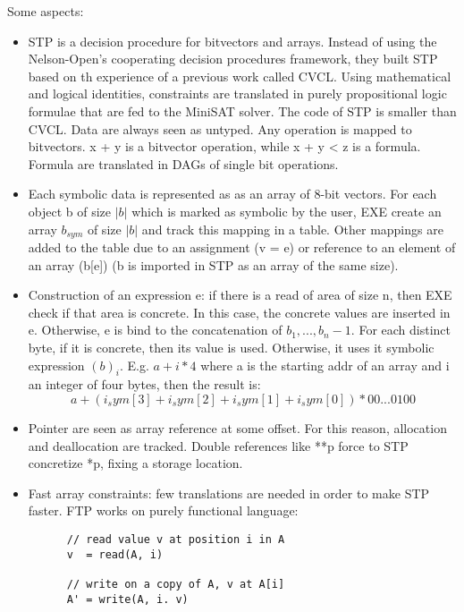Some aspects:
\begin{itemize}
  
  \item STP is a decision procedure for bitvectors and arrays. Instead of using the Nelson-Open's cooperating decision procedures framework, they built STP based on th experience of a previous work called CVCL. Using mathematical and logical identities, constraints are translated in purely propositional logic formulae that are fed to the MiniSAT solver. The code of STP is smaller than CVCL. Data are always seen as untyped. Any operation is mapped to bitvectors. x + y is a bitvector operation, while x + y < z is a formula. Formula are translated in DAGs of single bit operations. 

  \item Each symbolic data is represented as as an array of 8-bit vectors. For each object b of size $|b|$ which is marked as symbolic by the user, EXE create an array $b_{sym}$ of size $|b|$ and track this mapping in a table. Other mappings are added to the table due to an assignment (v = e) or reference to an element of an array (b[e]) (b is imported in STP as an array of the same size).

  \item Construction of an expression e: if there is a read of area of size n, then EXE check if that area is concrete. In this case, the concrete values are inserted in e. Otherwise, e is bind to the concatenation of $b_1,..., b_n-1$. For each distinct byte, if it is concrete, then its value is used. Otherwise, it uses it symbolic expression $(b)_i$. E.g.  $a + i*4$ where a is the starting addr of an array and i an integer of four bytes, then the result is:
    \[ a + (i_sym[3] + i_sym[2] + i_sym[1] + i_sym[0]) * 00...0100 \]

  \item Pointer are seen as array reference at some offset. For this reason, allocation and deallocation are tracked. Double references like **p force to STP concretize *p, fixing a storage location.

  \item Fast array constraints: few translations are needed in order to make STP faster. FTP works on purely functional language:
    \begin{lstlisting}
      // read value v at position i in A
      v  = read(A, i)      
      
      // write on a copy of A, v at A[i]
      A' = write(A, i. v)  
      

\end{lstlisting}
\end{itemize}
